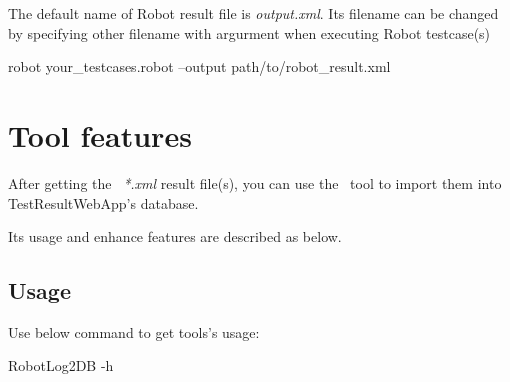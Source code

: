 The default name of Robot result file is \emph{output.xml}. Its filename can be changed by 
specifying other filename with argurment  when executing Robot 
testcase(s)
\begin{robotlog}
robot your_testcases.robot --output path/to/robot_result.xml
\end{robotlog}


\newpage
\hypertarget{description-tool-features}{%
\section{Tool features}\label{description-tool-features}}
After getting the \rfwcore\ \emph{*.xml} result file(s), you can use the \pkg\ tool to
import them into TestResultWebApp's database.

Its usage and enhance features are described as below.

\subsection{Usage}
Use below command to get tools's usage:
\begin{robotlog}
RobotLog2DB -h
\end{robotlog}

